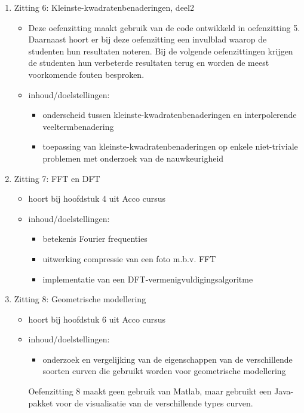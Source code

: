 \begin{enumerate}
	\item Zitting 6: Kleinste-kwadratenbenaderingen, deel2
	      \begin{itemize}
		      \item Deze oefenzitting maakt gebruik van de code ontwikkeld in oefenzitting 5. Daarnaast hoort er bij deze oefenzitting een invulblad waarop de studenten hun resultaten noteren. Bij de volgende oefenzittingen krijgen de studenten hun verbeterde resultaten terug en worden de meest voorkomende fouten besproken.
		      \item inhoud/doelstellingen:
		            \begin{itemize}
			            \item onderscheid tussen kleinste-kwadratenbenaderingen en interpolerende veeltermbenadering
			            \item toepassing van kleinste-kwadratenbenaderingen op enkele niet-triviale problemen met onderzoek van de nauwkeurigheid
		            \end{itemize}
	      \end{itemize}

	\item Zitting 7: FFT en DFT
	      \begin{itemize}
		      \item hoort bij hoofdstuk 4 uit Acco cursus
		      \item inhoud/doelstellingen:
		            \begin{itemize}
			            \item betekenis Fourier frequenties
			            \item uitwerking compressie van een foto m.b.v. FFT
			            \item implementatie van een DFT-vermenigvuldigingsalgoritme
		            \end{itemize}
	      \end{itemize}

	\item Zitting 8: Geometrische modellering
	      \begin{itemize}
		      \item hoort bij hoofdstuk 6 uit Acco cursus
		      \item inhoud/doelstellingen:
		            \begin{itemize}
			            \item onderzoek en vergelijking van de eigenschappen van de verschillende soorten curven die gebruikt worden voor geometrische modellering
		            \end{itemize}
		            Oefenzitting 8 maakt geen gebruik van Matlab, maar gebruikt een Java-pakket voor de visualisatie van de verschillende types curven.
	      \end{itemize}
\end{enumerate}

